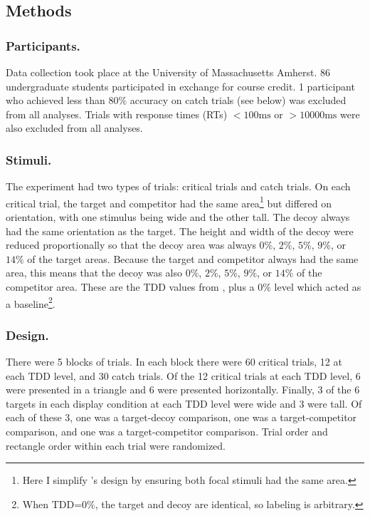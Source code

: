 \subsection{Methods}

\subsubsection{Participants.}
Data collection took place at the University of Massachusetts Amherst. 86 undergraduate students participated in exchange for course credit. 1 participant who achieved less than $80\%$ accuracy on catch trials (see below) was excluded from all analyses. Trials with response times (RTs) $<100\text{ms}$ or  $>10000\text{ms}$ were also excluded from all analyses.

\subsubsection{Stimuli.}
The experiment had two types of trials: critical trials and catch trials. 
On each critical trial, the target and competitor had the same area\footnote{Here I simplify \textcite{spektorWhenGoodLooks2018b}'s design by ensuring both focal stimuli had the same area.} but differed on orientation, with one stimulus being wide and the other tall. The decoy always had the same orientation as the target. The height and width of the decoy were reduced proportionally so that the decoy area was always $0\%$, $2\%$, $5\%$, $9\%$, or $14\%$ of the target areas. Because the target and competitor always had the same area, this means that the decoy was also $0\%$, $2\%$, $5\%$, $9\%$, or $14\%$ of the competitor area. These are the TDD values from \textcite{spektorWhenGoodLooks2018b}, plus a $0\%$ level which acted as a baseline\footnote{When TDD=$0\%$, the target and decoy are identical, so labeling is arbitrary.}.

\subsubsection{Design.}
There were 5 blocks of trials. In each block there were 60 critical trials, 12 at each TDD level, and 30 catch trials. Of the 12 critical trials at each TDD level, 6 were presented in a triangle and 6 were presented horizontally. Finally, 3 of the 6 targets in each display condition at each TDD level were wide and 3 were tall. Of each of these 3, one was a target-decoy comparison, one was a target-competitor comparison, and one was a target-competitor comparison. Trial order and rectangle order within each trial were randomized.

